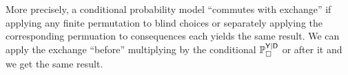 




More precisely, a conditional probability model ``commutes with exchange'' if applying any finite permutation to blind choices or separately applying the corresponding permuation to consequences each yields the same result. We can apply the exchange ``before'' multiplying by the conditional $\mathbb{P}_{\square}^{\mathsf{Y}|\mathsf{D}}$ or after it and we get the same result.

